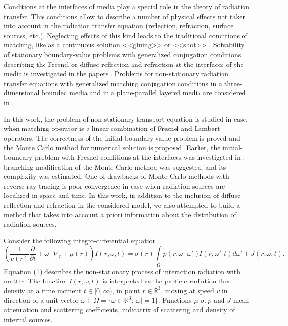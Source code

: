 \documentclass[12pt,reqno]{report}
\begin{document}
Conditions at the interfaces of media 
play a special role 
in the theory of radiation transfer. This conditions allow 
to describe a number of physical effects not taken into account in the radiation transfer equation (reflection, refraction, surface sources, etc.). Neglecting effects of this kind leads to the traditional conditions of matching, 
like 
as a continuous solution <<gluing>> or <<shot>> \cite{2.6}. Solvability of stationary boundary-value problems with generalized
conjugation 
conditions describing the Fresnel or diffuse reflection and refraction at the interfaces of the media is investigated in the papers \cite{19,20,21,22,23,24,25,26}. Problems for non-stationary radiation transfer equations with generalized matching
conjugation 
conditions in a three-dimensional bounded media and in a plane-parallel layered media are considered in \cite{27,28,29,30,31,32,33}.

In this work, the problem of non-stationary transport equation is studied in case, when matching operator is a linear combination of Fresnel and Lambert operators. The correctness of the initial-boundary value problem is proved and the Monte Carlo method for numerical solution 
is 
proposed. Earlier, the initial-boundary problem with Fresnel conditions at the interfaces was investigated in \cite{33}, branching modification of the Monte Carlo method was suggested, and its complexity was estimated. One of drawbacks of Monte Carlo methods with reverse ray tracing is poor convergence 
in case when radiation sources are localized in space and time. In this work, in addition to the inclusion of diffuse reflection and refraction in the considered model, we also attempted to build a method that takes into account a priori information about the distribution of radiation sources.

Consider the following integro-differential equation \cite{29,30,31,32,33}
\begin{equation}
\left (\frac{1}{v(r)} \frac{\partial }{\partial t } + \omega
\cdot \nabla_r + \mu(r) \right) I(r,\omega,t)=\sigma(r)
\int\limits_{\Omega} p(r,\omega \cdot
\omega')I(r,\omega',t)d\omega' + J(r,\omega,t).
\end{equation}
Equation (1) describes the non-stationary process of interaction
radiation with matter. The function $I(r,\omega,t)$ is interpreted as the  
particle 
radiation flux density at a time moment $t\in [0,\infty)$,
in point $r\in \mathbb{R}^3$, moving at speed $v$ in
direction of a unit vector $\omega \in \Omega=\{\omega \in
\mathbb{R}^3: |\omega|=1\}$. Functions $\mu,\sigma, p$ and $J$ mean
attenuation and scattering coefficients,
indicatrix of scattering and density of internal sources.
\end{document}
